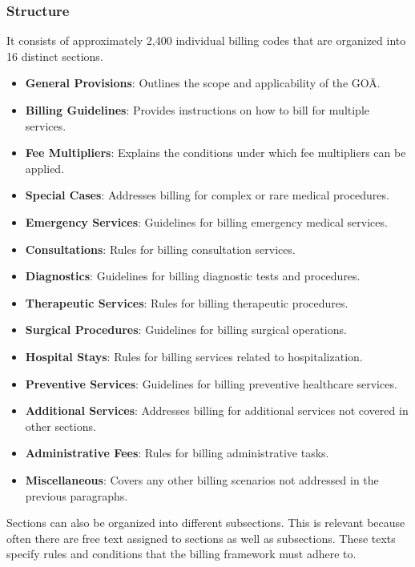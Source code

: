 \subsubsection{Structure}
It consists of approximately 2,400 individual billing codes that are organized into 16 distinct sections\cite[]{hermanns2011gebuhrenordnung}.

\begin{itemize}
    \item \textbf{General Provisions}: Outlines the scope and applicability of the GOÄ.
    \item \textbf{Billing Guidelines}: Provides instructions on how to bill for multiple services.
    \item \textbf{Fee Multipliers}: Explains the conditions under which fee multipliers can be applied.
    \item \textbf{Special Cases}: Addresses billing for complex or rare medical procedures.
    \item \textbf{Emergency Services}: Guidelines for billing emergency medical services.
    \item \textbf{Consultations}: Rules for billing consultation services.
    \item \textbf{Diagnostics}: Guidelines for billing diagnostic tests and procedures.
    \item \textbf{Therapeutic Services}: Rules for billing therapeutic procedures.
    \item \textbf{Surgical Procedures}: Guidelines for billing surgical operations.
    \item \textbf{Hospital Stays}: Rules for billing services related to hospitalization.
    \item \textbf{Preventive Services}: Guidelines for billing preventive healthcare services.
    \item \textbf{Additional Services}: Addresses billing for additional services not covered in other sections.
    \item \textbf{Administrative Fees}: Rules for billing administrative tasks.
    \item \textbf{Miscellaneous}: Covers any other billing scenarios not addressed in the previous paragraphs.
\end{itemize}
Sections can also be organized into different subsections.
This is relevant because often there are free text assigned to sections as well as subsections.
These texts specify rules and conditions that the billing framework must adhere to.

